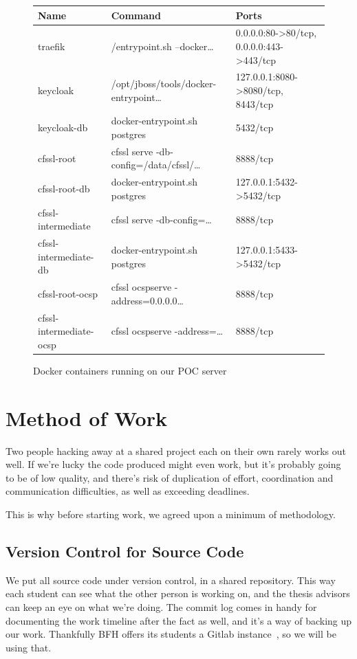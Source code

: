 \begin{figure}
    \begin{center}
        \begin{tabular}{p{3.4cm}p{5.7cm}p{6.2cm}}
            \hline
            \textbf{Name} & \textbf{Command} & \textbf{Ports} \\ \hline
            traefik & /entrypoint.sh --docker\ldots & 0.0.0.0:80->80/tcp, 0.0.0.0:443->443/tcp \\*
            keycloak & /opt/jboss/tools/docker-entrypoint\ldots & 127.0.0.1:8080->8080/tcp, 8443/tcp \\*
            keycloak-db & docker-entrypoint.sh postgres & 5432/tcp \\*
            cfssl-root & cfssl serve -db-config=/data/cfssl/\ldots & 8888/tcp \\*
            cfssl-root-db & docker-entrypoint.sh postgres & 127.0.0.1:5432->5432/tcp \\*
            cfssl-intermediate & cfssl serve -db-config=\ldots & 8888/tcp \\*
            cfssl-intermediate-db & docker-entrypoint.sh postgres & 127.0.0.1:5433->5432/tcp \\*
            cfssl-root-ocsp & cfssl ocspserve -address=0.0.0.0\ldots & 8888/tcp \\*
            cfssl-intermediate-ocsp & cfssl ocspserve -address=\ldots & 8888/tcp \\*
        \end{tabular}
        \caption{Docker containers running on our POC server}\label{tbl:docker}
    \end{center}
\end{figure}

\section{Method of Work}\label{sec:method-of-work}
Two people hacking away at a shared project each on their own rarely works out well.
If we're lucky the code produced might even work, but it's probably going to be of low quality,
and there's risk of duplication of effort,
coordination and communication difficulties,
as well as exceeding deadlines.

This is why before starting work, we agreed upon a minimum of methodology.

\subsection{Version Control for Source Code}\label{subsec:version-control-for-source-code}
We put all source code under version control, in a shared repository.
This way each student can see what the other person is working on,
and the thesis advisors can keep an eye on what we're doing.
The commit log comes in handy for documenting the work timeline after the fact as well,
and it's a way of backing up our work.
Thankfully \gls{BFH} offers its students a Gitlab instance~\cite{gitlab}, so we will be using that.

